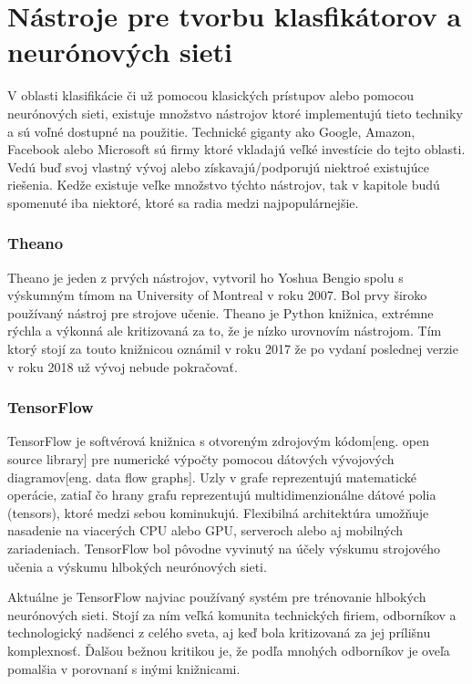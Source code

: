 
\section{Nástroje pre tvorbu klasfikátorov a neurónových sieti}

V oblasti klasifikácie či už pomocou klasických prístupov alebo pomocou neurónových sieti, existuje množstvo nástrojov
    ktoré implementujú tieto techniky a sú voľné dostupné na použitie.
Technické giganty ako Google, Amazon, Facebook alebo Microsoft sú firmy ktoré vkladajú veľké investície do tejto oblasti.
Vedú buď svoj vlastný vývoj alebo získavajú/podporujú niektroé existujúce riešenia.
Kedže existuje veľke množstvo týchto nástrojov, tak v kapitole budú spomenuté iba niektoré, ktoré sa radia medzi najpopulárnejšie\cite{odkaz:FrameworkComparison}.

\subsubsection{Theano}

Theano je jeden z prvých nástrojov, vytvoril ho Yoshua Bengio spolu s výskumným tímom na University of Montreal v roku 2007.
Bol prvy široko používaný nástroj pre strojove učenie.
Theano je Python knižnica, extrémne rýchla a výkonná ale kritizovaná za to, že je nízko urovnovím nástrojom.
Tím ktorý stojí za touto knižnicou oznámil v roku 2017 že po vydaní poslednej verzie v roku 2018 už vývoj nebude pokračovať\cite{odkaz:FrameworkComparison}.

\subsubsection{TensorFlow}

TensorFlow je softvérová knižnica s otvoreným zdrojovým kódom[eng. open source library] pre numerické výpočty pomocou dátových vývojových diagramov[eng. data flow graphs].
Uzly v grafe reprezentujú matematické operácie, zatiaľ čo hrany grafu reprezentujú multidimenzionálne dátové polia (tensors), ktoré medzi sebou kominukujú.
Flexibilná architektúra umožňuje nasadenie na viacerých CPU alebo GPU, serveroch alebo aj mobilných zariadeniach.
TensorFlow bol pôvodne vyvinutý na účely výskumu strojového učenia a výskumu hlbokých neurónových sieti\cite{odkaz:TensorFlow}.

Aktuálne je TensorFlow najviac používaný systém pre trénovanie hlbokých neurónových sieti.
Stojí za ním veľká komunita technických firiem, odborníkov a technologický nadšenci z celého sveta, aj keď bola kritizovaná za jej prílišnu komplexnosť.
Ďalšou bežnou kritikou je, že podľa mnohých odborníkov je oveľa pomalšia v porovnaní s inými knižnicami\cite{odkaz:FrameworkComparison}.

